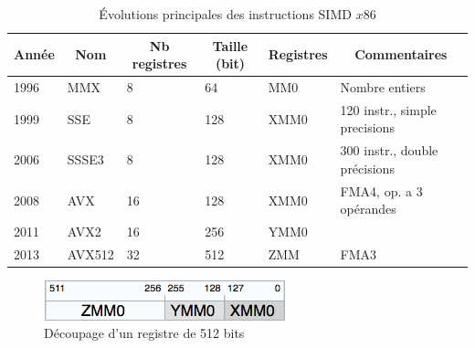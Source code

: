 \begin{table}[]
\centering
\caption{Évolutions principales des instructions SIMD $x86$}
\label{tab_simd}
\begin{tabular}{|l|l|l|l|l|l|}
\hline
\multicolumn{1}{|c|}{\textbf{Année}} & \multicolumn{1}{c|}{\textbf{Nom}} & \multicolumn{1}{c|}{\textbf{Nb registres}} & \multicolumn{1}{c|}{\textbf{Taille (bit)}} & \multicolumn{1}{c|}{\textbf{Registres}} & \multicolumn{1}{c|}{\textbf{Commentaires}} \\ \hline
1996                                 & MMX                               & 8                                          & 64                                         & MM0                                     & Nombre entiers
\\ \hline
1999                                 & SSE                               & 8                                          & 128                                        & XMM0                                    & 120 instr., simple precisions              \\ \hline
2006                                 & SSSE3                             & 8                                          & 128                                        & XMM0                                    & 300 instr., double précisions              \\ \hline
2008                                 & AVX                               & 16                                         & 128                                        & XMM0                                    & FMA4, op. a 3 opérandes                    \\ \hline
2011                                 & AVX2                              &  16                                          & 256                                        & YMM0                                    &                                            \\ \hline
2013                                 & AVX512                            & 32                                         & 512                                        & ZMM                                     & FMA3                                       \\ \hline
\end{tabular}
\end{table}

\begin{figure}
    \center
    \includegraphics[width=7cm]{images/Chapitre1/simd_registres.png}
    \caption{\label{pic_simd_registres} Découpage d'un registre de 512 bits}
\end{figure}

